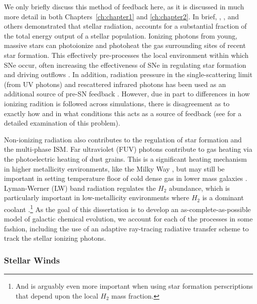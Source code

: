 We only briefly discuss this method of feedback here, as it is discussed in much more detail in both Chapters~\ref{ch:chapter1} and \ref{ch:chapter2}. In brief, \cite{Leitherer1999}, \cite{Agertz2013}, and others demonstrated that stellar radiation, accounts for a substantial fraction of the total energy output of a stellar population. Ionizing photons from young, massive stars can photoionize and photoheat the gas surrounding sites of recent star formation. This effectively pre-processes the local environment within which SNe occur, often increasing the effectiveness of SNe in regulating star formation and driving outflows \citep{Hu2016}. In addition, radiation pressure in the single-scattering limit (from UV photons) and rescattered infrared photons has been used as an additional source of pre-SN feedback \citep[e.g.][]{FIRE}. However, due in part to differences in how ionizing radition is followed across simulations, there is disagreement as to exactly how and in what conditions this acts as a source of feedback (see \cite{Krumholz2018} for a detailed examination of this problem).

Non-ionizing radiation also contributes to the regulation of star formation and the multi-phase ISM. Far ultraviolet (FUV) photons contribute to gas heating via the photoelectric heating of dust grains. This is a significant heating mechanism in higher metallicity environments, like the Milky Way \citep{Parravano2003,Wolfire2003}, but may still be important in setting temperature floor of cold dense gas in lower mass galaxies \citep{Forbes2016,Hu2017}. Lyman-Werner (LW) band radiation regulates the $H_2$ abundance, which is particularly important in low-metallicity environments where $H_2$ is a dominant coolant \citep[e.g.][]{Wolcott-Green2012}.\footnote{And is arguably even more important when using star formation perscriptions that depend upon the local $H_2$ mass fraction.} As the goal of this dissertation is to develop an as-complete-as-possible model of galactic chemical evolution, we account for each of the processes in some fashion, including the use of an adaptive ray-tracing radiative transfer scheme to track the stellar ionizing photons.

\subsubsection{Stellar Winds}
\label{intro:sec:stellarwinds}

